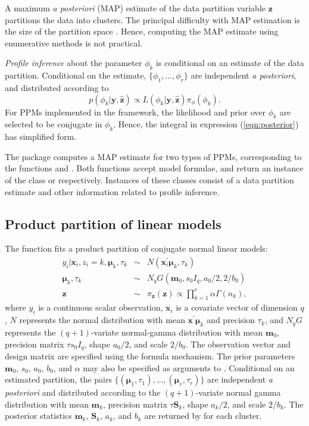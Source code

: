 \documentclass[article, nojss]{jss}
\newcommand{\bz}{\boldsymbol{z}}
\newcommand{\bmu}{\boldsymbol{\mu}}
\newcommand{\bx}{\boldsymbol{x}}
\newcommand{\by}{\boldsymbol{y}}
\newcommand{\bm}{\boldsymbol{m}}
\newcommand{\bS}{\boldsymbol{S}}
\begin{document}
A maximum {\it a posteriori} (MAP) estimate of the data partition variable $\bz$ partitions the data into clusters. The principal difficulty with MAP estimation is the size of the partition space \citep[see the `Bell number',][]{Bell1934, Rota1964}. Hence, computing the MAP estimate using enumerative methods is not practical.


{\it Profile inference} about the parameter $\phi_k$ is conditional on an estimate of the data partition. Conditional on the estimate, $\{\phi_1, \ldots, \phi_r\}$ are independent {\it a posteriori}, and distributed according to 
\begin{displaymath}
p(\phi_k | \by, \hat{\bz}) \propto L(\phi_k|\by, \hat{\bz}) \pi_{\phi}(\phi_k).
\end{displaymath}
For PPMs implemented in the  framework, the likelihood and prior over $\phi_k$ are selected to be conjugate in $\phi_k$. Hence, the integral in expression (\ref{eqn:posterior}) has simplified form.

The  package computes a MAP estimate for two types of PPMs, corresponding to the  functions  and . Both functions accept model formulae, and return an instance of the class  or  respectively. Instances of these classes consist of a data partition estimate and other information related to profile inference. 

\subsection{Product partition of linear models}

The  function fits a product partition of conjugate normal linear models:
\begin{eqnarray}
y_i | \bx_i, z_i = k, \bmu_k, \tau_k & \sim & N(\bx_i^{\prime}\bmu_k, \tau_k) \nonumber \\
\bmu_k, \tau_k & \sim & N_qG(\bm_0, s_0I_q, a_0/2, 2/b_0) \nonumber \\
\bz & \sim & \pi_{\bz}(\bz) \propto \prod_{k=1}^r \alpha \Gamma(n_k),
\end{eqnarray}
where $y_i$ is a continuous scalar observation, $\bx_i$ is a covariate vector of dimension $q$, $N$ represents the normal distribution with mean $\bx^{\prime}\bmu_k$ and precision $\tau_k$, and $N_qG$ represents the $(q+1)$-variate normal-gamma distribution with mean $\bm_0$, precision matrix $\tau s_0I_q$, shape $a_0/2$, and scale $2/b_0$. The observation vector and design matrix are specified using the  formula mechanism. The prior parameters $\bm_0$, $s_0$, $a_0$, $b_0$, and $\alpha$ may also be specified as arguments to . Conditional on an estimated partition, the pairs $\{(\bmu_1, \tau_1), \ldots, (\bmu_r, \tau_r)\}$ are independent {\it a posteriori} and distributed according to the $(q+1)$-variate normal gamma distribution with mean $\bm_k$, precision matrix $\tau\bS_k$, shape $a_k/2$, and scale $2/b_k$. The posterior statistics $\bm_k$, $\bS_k$, $a_k$, and $b_k$ are returned by  for each cluster.
\end{document}
